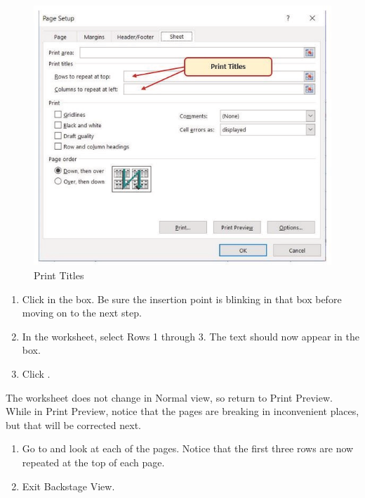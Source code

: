 \begin{figure}[H]
	\centering
	\includegraphics[width=\maxwidth{.95\linewidth}]{gfx/ch03_fig29}
	\caption{Print Titles}
	\label{03:fig29}
\end{figure}

\begin{enumerate}[resume]
	\item Click in the  box. Be sure the insertion point is blinking in that box before moving on to the next step.
	\item In the worksheet, select Rows 1 through 3. The text  should now appear in the  box.
	\item Click .
\end{enumerate}

The worksheet does not change in Normal view, so return to Print Preview. While in Print Preview, notice that the pages are breaking in inconvenient places, but that will be corrected next.

\begin{enumerate}
	\item Go to  and look at each of the pages. Notice that the first three rows are now repeated at the top of each page.
	\item Exit Backstage View.
\end{enumerate}

